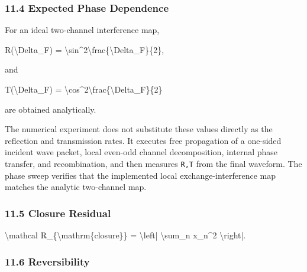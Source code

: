 \documentclass[
  a4paper,
]{article}
\newenvironment{Shaded}{}{}
\newcommand{\NormalTok}[1]{#1}
\begin{document}
\subsubsection{11.4 Expected Phase
Dependence}\label{expected-phase-dependence}

For an ideal two-channel interference map,

\begin{Shaded}
\begin{Highlighting}[]
\NormalTok{R(\textbackslash{}Delta\_F)}
\NormalTok{=}
\NormalTok{\textbackslash{}sin\^{}2\textbackslash{}frac\{\textbackslash{}Delta\_F\}\{2\},}
\end{Highlighting}
\end{Shaded}

and

\begin{Shaded}
\begin{Highlighting}[]
\NormalTok{T(\textbackslash{}Delta\_F)}
\NormalTok{=}
\NormalTok{\textbackslash{}cos\^{}2\textbackslash{}frac\{\textbackslash{}Delta\_F\}\{2\}}
\end{Highlighting}
\end{Shaded}

are obtained analytically.

The numerical experiment does not substitute these values directly as
the reflection and transmission rates. It executes free propagation of a
one-sided incident wave packet, local even-odd channel decomposition,
internal phase transfer, and recombination, and then measures
\texttt{R,T} from the final waveform. The phase sweep verifies that the
implemented local exchange-interference map matches the analytic
two-channel map.

\subsubsection{11.5 Closure Residual}\label{closure-residual}

\begin{Shaded}
\begin{Highlighting}[]
\NormalTok{\textbackslash{}mathcal R\_\{\textbackslash{}mathrm\{closure\}\}}
\NormalTok{=}
\NormalTok{\textbackslash{}left|}
\NormalTok{\textbackslash{}sum\_n x\_n\^{}2}
\NormalTok{\textbackslash{}right|.}
\end{Highlighting}
\end{Shaded}

\subsubsection{11.6 Reversibility}\label{reversibility}
\end{document}
